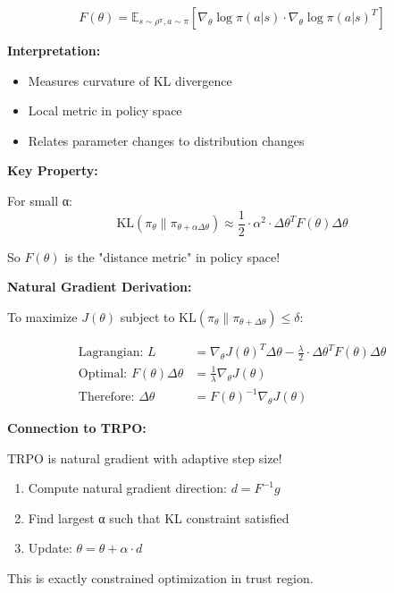 \documentclass[12pt]{article}
\begin{document}
{{\begin{equation}
F(\theta) = \mathbb{E}_{s \sim \rho^\pi, a \sim \pi} [\nabla_\theta \log \pi(a|s) \cdot \nabla_\theta \log \pi(a|s)^T]
\end{equation}

\textbf{Interpretation:}
\begin{itemize}
\item Measures curvature of KL divergence
\item Local metric in policy space
\item Relates parameter changes to distribution changes
\end{itemize}

\textbf{Key Property:}

For small α:
\begin{equation}
\text{KL}(\pi_\theta \| \pi_{\theta+\alpha\Delta\theta}) \approx \frac{1}{2} \cdot \alpha^2 \cdot \Delta\theta^T F(\theta) \Delta\theta
\end{equation}

So $F(\theta)$ is the "distance metric" in policy space!

\textbf{Natural Gradient Derivation:}

To maximize $J(\theta)$ subject to $\text{KL}(\pi_\theta \| \pi_{\theta+\Delta\theta}) \leq \delta$:

\begin{align}
\text{Lagrangian: } L &= \nabla_\theta J(\theta)^T \Delta\theta - \frac{\lambda}{2} \cdot \Delta\theta^T F(\theta) \Delta\theta \\
\text{Optimal: } F(\theta) \Delta\theta &= \frac{1}{\lambda} \nabla_\theta J(\theta) \\
\text{Therefore: } \Delta\theta &= F(\theta)^{-1} \nabla_\theta J(\theta)
\end{align}

\textbf{Connection to TRPO:}

TRPO is natural gradient with adaptive step size!

\begin{enumerate}
\item Compute natural gradient direction: $d = F^{-1} g$
\item Find largest α such that KL constraint satisfied
\item Update: $\theta = \theta + \alpha \cdot d$
\end{enumerate}

This is exactly constrained optimization in trust region.

}}
\end{document}
